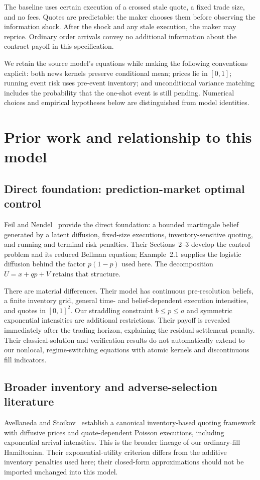 \documentclass[11pt]{article}
\newcommand{\1}{\mathbf 1}
\begin{document}
The baseline uses certain execution of a crossed stale quote, a fixed trade
size, and no fees. Quotes are predictable: the maker chooses them before
observing the information shock. After the shock and any stale execution,
the maker may reprice. Ordinary order arrivals convey no additional information
about the contract payoff in this specification.

We retain the source model's equations while making the following conventions
explicit: both news kernels preserve conditional mean; prices lie in $[0,1]$;
running event risk uses pre-event inventory; and unconditional variance matching
includes the probability that the one-shot event is still pending. Numerical
choices and empirical hypotheses below are distinguished from model identities.

\section{Prior work and relationship to this model}
\label{sec:prior}
\subsection{Direct foundation: prediction-market optimal control}
Feil and Nendel~\cite{feilnendel2026} provide the direct foundation: a bounded
martingale belief generated by a latent diffusion, fixed-size executions,
inventory-sensitive quoting, and running and terminal risk penalties.
Their Sections~2--3 develop the control problem and its reduced Bellman equation;
Example~2.1 supplies the logistic diffusion behind the factor $p(1-p)$ used here.
The decomposition $U=x+qp+V$ retains that structure.

There are material differences. Their model has continuous pre-resolution
beliefs, a finite inventory grid, general time- and belief-dependent execution
intensities, and quotes in $[0,1]^2$. Our straddling constraint $b\le p\le a$
and symmetric exponential intensities are additional restrictions. Their payoff
is revealed immediately after the trading horizon, explaining the residual
settlement penalty. Their classical-solution and verification results do not
automatically extend to our nonlocal, regime-switching equations with atomic
kernels and discontinuous fill indicators.

\subsection{Broader inventory and adverse-selection literature}
Avellaneda and Stoikov~\cite{avellanedastoikov2008} establish a canonical
inventory-based quoting framework with diffusive prices and quote-dependent
Poisson executions, including exponential arrival intensities. This is the
broader lineage of our ordinary-fill Hamiltonian. Their exponential-utility
criterion differs from the additive inventory penalties used here; their
closed-form approximations should not be imported unchanged into this model.
\end{document}
